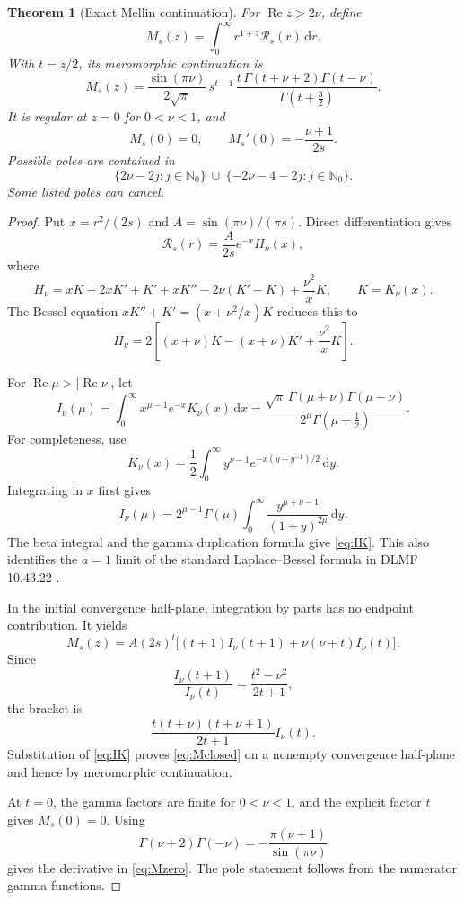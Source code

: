 \documentclass[11pt,a4paper]{article}
\newcommand{\NN}{\mathbb N}
\newcommand{\dd}{\mathrm d}
\newcommand{\abs}[1]{\lvert#1\rvert}
\theoremstyle{plain}
\newtheorem{theorem}{Theorem}[section]
\theoremstyle{definition}
\theoremstyle{remark}
\numberwithin{equation}{section}
\begin{document}
\begin{theorem}[Exact Mellin continuation]
\label{thm:Mellin}
For \(\operatorname{Re}z>2\nu\), define
\[
 M_s(z)=\int_0^\infty r^{1+z}\mathcal R_s(r)\,\dd r.
\]
With \(t=z/2\), its meromorphic continuation is
\begin{equation}
 \boxed{
 M_s(z)=
 \frac{\sin(\pi\nu)}{2\sqrt\pi}\,
 s^{t-1}\,
 \frac{t\,\Gamma(t+\nu+2)\Gamma(t-\nu)}
      {\Gamma(t+\tfrac32)}.
 }
 \label{eq:Mclosed}
\end{equation}
It is regular at \(z=0\) for \(0<\nu<1\), and
\begin{equation}
 M_s(0)=0,\qquad
 M_s'(0)=-\frac{\nu+1}{2s}.
 \label{eq:Mzero}
\end{equation}
Possible poles are contained in
\[
 \{2\nu-2j:j\in\NN_0\}
 \ \cup\
 \{-2\nu-4-2j:j\in\NN_0\}.
\]
Some listed poles can cancel.
\end{theorem}

\begin{proof}
Put \(x=r^2/(2s)\) and
\(A=\sin(\pi\nu)/(\pi s)\).
Direct differentiation gives
\[
 \mathcal R_s(r)=\frac{A}{2s}e^{-x}H_\nu(x),
\]
where
\[
 H_\nu=
 xK-2xK'+K'+xK''
       -2\nu(K'-K)+\frac{\nu^2}{x}K,
 \qquad K=K_\nu(x).
\]
The Bessel equation
\(xK''+K'=(x+\nu^2/x)K\) reduces this to
\[
 H_\nu=2\left[(x+\nu)K-(x+\nu)K'
                         +\frac{\nu^2}{x}K\right].
\]

For \(\operatorname{Re}\mu>\abs{\operatorname{Re}\nu}\), let
\begin{equation}
 I_\nu(\mu)
 =\int_0^\infty x^{\mu-1}e^{-x}K_\nu(x)\,\dd x
 =\frac{\sqrt\pi\,\Gamma(\mu+\nu)\Gamma(\mu-\nu)}
        {2^\mu\Gamma(\mu+\tfrac12)}.
 \label{eq:IK}
\end{equation}
For completeness, use
\[
 K_\nu(x)=\frac12\int_0^\infty
 y^{\nu-1}e^{-x(y+y^{-1})/2}\,\dd y.
\]
Integrating in \(x\) first gives
\[
 I_\nu(\mu)
 =2^{\mu-1}\Gamma(\mu)
   \int_0^\infty
      \frac{y^{\mu+\nu-1}}{(1+y)^{2\mu}}\,\dd y.
\]
The beta integral and the gamma duplication formula give
\eqref{eq:IK}. This also identifies the \(a=1\) limit of the
standard Laplace--Bessel formula in DLMF 10.43.22
\cite{DLMF}.

In the initial convergence half-plane, integration by parts
has no endpoint contribution. It yields
\[
 M_s(z)=A(2s)^t
 \bigl[(t+1)I_\nu(t+1)+\nu(\nu+t)I_\nu(t)\bigr].
\]
Since
\[
 \frac{I_\nu(t+1)}{I_\nu(t)}
 =\frac{t^2-\nu^2}{2t+1},
\]
the bracket is
\[
 \frac{t(t+\nu)(t+\nu+1)}{2t+1}I_\nu(t).
\]
Substitution of \eqref{eq:IK} proves \eqref{eq:Mclosed}
on a nonempty convergence half-plane and hence by meromorphic
continuation.

At \(t=0\), the gamma factors are finite for \(0<\nu<1\),
and the explicit factor \(t\) gives \(M_s(0)=0\).
Using
\[
 \Gamma(\nu+2)\Gamma(-\nu)
 =-\frac{\pi(\nu+1)}{\sin(\pi\nu)}
\]
gives the derivative in \eqref{eq:Mzero}.
The pole statement follows from the numerator gamma functions.
\end{proof}
\end{document}
